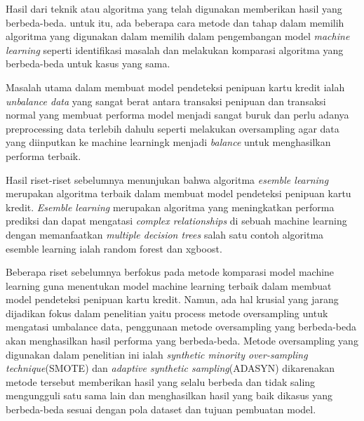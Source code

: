 Hasil dari teknik atau algoritma yang telah digunakan memberikan hasil yang berbeda-beda. untuk itu, ada beberapa cara metode dan tahap dalam memilih algoritma yang digunakan dalam memilih dalam pengembangan model \textit{machine learning} seperti identifikasi masalah dan melakukan komparasi algoritma yang berbeda-beda untuk kasus yang sama\cite{mniai2023novel}.

Masalah utama dalam membuat model pendeteksi penipuan kartu kredit ialah \textit{unbalance data} yang sangat berat antara transaksi penipuan dan transaksi normal yang membuat performa model menjadi sangat buruk dan perlu adanya preprocessing data terlebih dahulu seperti melakukan oversampling agar data yang diinputkan ke machine learningk menjadi \textit{balance} untuk menghasilkan performa terbaik\cite{mniai2023novel}.

Hasil riset-riset sebelumnya menunjukan bahwa algoritma \textit{esemble learning} merupakan algoritma terbaik dalam membuat model pendeteksi penipuan kartu kredit\cite{ningsih2022analisis}. \textit{Esemble learning} merupakan algoritma yang meningkatkan performa prediksi dan dapat mengatasi \textit{complex relationships} di sebuah machine learning dengan memanfaatkan \textit{multiple decision trees} salah satu contoh  algoritma esemble learning ialah random forest dan xgboost\cite{dietterich2002ensemble}.

Beberapa riset sebelumnya berfokus pada metode komparasi model machine learning guna menentukan model machine learning terbaik dalam membuat model pendeteksi penipuan kartu kredit\cite{mniai2023novel}. Namun, ada hal krusial yang jarang dijadikan fokus dalam penelitian yaitu process metode oversampling untuk mengatasi umbalance data, penggunaan metode oversampling yang berbeda-beda akan menghasilkan hasil performa yang berbeda-beda\cite{liu2004effect}. Metode oversampling yang digunakan dalam penelitian ini ialah \textit{synthetic minority over-sampling technique}(SMOTE)\cite{chawla2002smote} dan \textit{adaptive synthetic sampling}(ADASYN)\cite{4633969} dikarenakan metode tersebut memberikan hasil yang selalu berbeda dan tidak saling mengungguli satu sama lain dan menghasilkan hasil yang baik dikasus yang berbeda-beda sesuai dengan pola dataset dan tujuan pembuatan model\cite{brandt2021comparative}.

